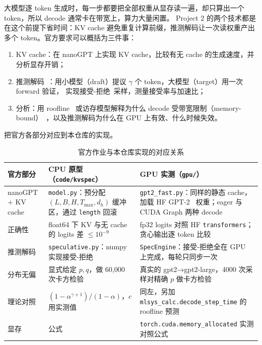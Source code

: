 \documentclass[11pt,a4paper]{ctexart}
\begin{document}
大模型逐 token 生成时，每一步都要把全部权重从显存读一遍，却只算出一个 token，所以 decode 通常卡在带宽上，算力大量闲置。
Project 2 的两个技术都是在这个前提下省时间：KV cache 避免重复计算前缀，推测解码让一次读权重产出多个 token。官方要求可以概括为三件事：
\begin{enumerate}
  \item KV cache：在 nanoGPT 上实现 KV cache，比较有无 cache 的生成速度，并分析显存开销；
  \item 推测解码~\cite{leviathan}：用小模型（draft）提议 $\gamma$ 个 token，大模型（target）用一次 forward 验证，
        实现接受-拒绝~\cite{chen}采样，测量接受率与加速比；
  \item 分析：用 roofline~\cite{roofline} 或访存模型解释为什么 decode 受带宽限制（memory-bound）~\cite{pope}，以及推测解码为什么在 GPU 上有效、什么时候失效。
\end{enumerate}
 把官方各部分对应到本仓库的实现。

\begin{table}[H]
\centering\small
\caption{官方作业与本仓库实现的对应关系}\label{tab:map}
\begin{tabularx}{\linewidth}{>{\raggedright\arraybackslash}p{2.3cm} >{\raggedright\arraybackslash}X >{\raggedright\arraybackslash}X}
\toprule
官方部分 & CPU 原型（\texttt{code/kvspec}） & GPU 实测（\texttt{gpu/}） \\
\midrule
nanoGPT + KV cache & \texttt{model.py}：预分配 $(L,B,H,T_{\max},d_h)$ 缓冲区，通过 \texttt{length} 回滚 &
  \texttt{gpt2\_fast.py}：同样的静态 cache，加载 HF GPT-2~\cite{gpt2} 权重；eager 与 CUDA Graph 两种 decode \\
正确性 & float64 下 KV 与无 cache 的 logits 差 $\le10^{-9}$ & fp32 logits 对照 HF \texttt{transformers}；贪心输出逐 token 比较 \\
推测解码 & \texttt{speculative.py}：numpy 实现接受-拒绝 & \texttt{SpecEngine}：接受-拒绝全在 GPU 上完成，每轮只同步一次 \\
分布无偏 & 显式给定 $p,q$，做 60{,}000 次卡方检验 & 真实的 gpt2→gpt2-large，4000 次采样对精确 $p$ 做卡方检验 \\
理论对照 & $(1-\alpha^{\gamma+1})/(1-\alpha)$，$c$ 用实测值 & 同左，另加 \texttt{mlsys\_calc.decode\_step\_time} 的 roofline 预测 \\
显存 & 公式 & \texttt{torch.cuda.memory\_allocated} 实测对照公式 \\
\bottomrule
\end{tabularx}
\end{table}
\end{document}
